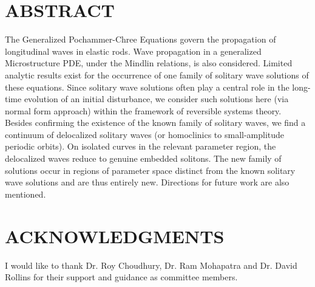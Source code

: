 \chapter*{ABSTRACT}

\indent 

The Generalized Pochammer-Chree Equations govern the propagation of longitudinal waves in elastic rods.
Wave propagation in a generalized Microstructure PDE, under the Mindlin relations, is also considered.
Limited analytic results exist for the occurrence of one family of  solitary wave solutions of these equations.
Since solitary wave solutions often play a central role in the long-time evolution of an initial disturbance, we consider
such solutions here (via normal form approach) within the framework of reversible systems theory. Besides confirming
the existence of the known family of solitary waves, we find a continuum of delocalized solitary waves
(or homoclinics to small-amplitude periodic orbits).
On isolated curves in the relevant parameter region, the delocalized waves reduce to genuine embedded solitons.
The new family of solutions occur in regions of parameter space distinct from the known solitary wave solutions and
are thus entirely new.  Directions for future work are also mentioned.



\dedication{
The Family
}



\newpage
{}
\chapter*{ACKNOWLEDGMENTS}

I would like to thank Dr. Roy Choudhury, Dr. Ram Mohapatra and Dr. David Rollins for their support and guidance as committee members.

\newpage
